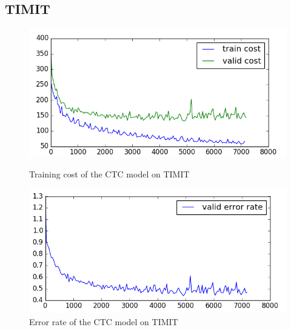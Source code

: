 \documentclass[11pt,a4paper]{article}
\begin{document}

\subsection{TIMIT}

\begin{figure}[H]
    \hfill{}
    \begin{minipage}{.5\textwidth}
        \centering
        \includegraphics[width=0.95\linewidth]{pouet_timit_cost.png}
        \caption{\footnotesize Training cost of the CTC model on TIMIT}
        \label{timit_cost}
    \end{minipage}
    \hfill{}
    \begin{minipage}{.45\textwidth}
        \centering
		\vspace{1em}
        \includegraphics[width=0.95\linewidth]{pouet_timit_ER.png}
        \caption{\footnotesize Error rate of the CTC model on TIMIT}
        \label{timit_er}
    \end{minipage}
    \hfill{}
\end{figure}
\end{document}
